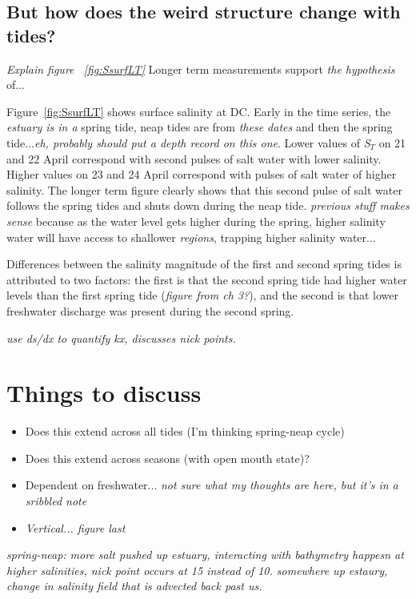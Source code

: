 \subsection{But how does the weird structure change with tides?}
\emph{Explain figure ~\ref{fig:SsurfLT}}
Longer term measurements support \emph{the hypothesis} of...

Figure~\ref{fig:SsurfLT} shows surface salinity at DC. Early in the time series, the \emph{estuary is in a} spring tide, neap tides are from \emph{these dates} and then the spring tide...\emph{eh, probably should put a depth record on this one}. Lower values of \emph{S$_T$} on 21 and 22 April correspond with second pulses of salt water with lower salinity. Higher values on 23 and 24 April correspond with pulses of salt water of higher salinity. The longer term figure clearly shows that this second pulse of salt water follows the spring tides and shuts down during the neap tide. \emph{previous stuff makes sense} because as the water level gets higher during the spring, higher salinity water will have access to shallower \emph{regions}, trapping higher salinity water... 

Differences between the salinity magnitude of the first and second spring tides is attributed to two factors: the first is that the second spring tide had higher water levels than the first spring tide (\emph{figure from ch 3?}), and the second is that lower freshwater discharge was present during the second spring. 



\emph{use ds/dx to quantify kx, discusses nick points.}
\section{Things to discuss}
\begin{itemize}
	\item Does this extend across all tides (I'm thinking spring-neap cycle)
	\item Does this extend across seasons (with open mouth state)?
	\item Dependent on freshwater... \emph{not sure what my thoughts are here, but it's in a sribbled note}
	\item \emph{Vertical... figure last}
\end{itemize}



\emph{spring-neap:
more salt pushed up estuary, interacting with bathymetry happesn at higher salinities, nick point occurs at 15 instead of 10. somewhere up estaury, change in salinity field that is advected back past us. }

